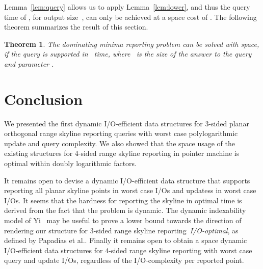 \documentclass[]{article}
\newtheorem{theorem}{Theorem}[section]
\begin{document}
Lemma~\ref{lem:query} allows us to apply Lemma~\ref{lem:lower}, and thus the
query time of , for output size~, can only be
achieved at a space cost of . The following theorem summarizes
the result of this section.
\begin{theorem} \label{thm:lower}
  The dominating minima reporting problem can be solved with
   space, if the query is
  supported in~ time, where~ is the size of the
  answer to the query and parameter .
\end{theorem}

\section{Conclusion} \label{sect:concl}


We presented the first dynamic I/O-efficient data structures for 3-sided planar
orthogonal range skyline reporting queries with worst case polylogarithmic
update and query complexity. We also showed that the space usage of the existing
structures for 4-sided range skyline reporting in pointer machine is optimal
within doubly logarithmic factors.

It remains open to devise a dynamic I/O-efficient data structure that supports
reporting all  planar skyline points in  worst case I/Os and
updatess in  worst case I/Os. It seems that the hardness for
reporting the skyline in optimal time is derived from the fact that the problem
is dynamic. The dynamic indexability model of Yi~\cite{Y09} may be useful to
prove a lower bound towards the direction of rendering our structure for 3-sided
range skyline reporting~\textit{I/O-optimal}, as defined by Papadias et
al.\cite{PTFS05}. Finally it remains open to obtain a  space dynamic I/O-efficient data structures for 4-sided range skyline
reporting with  worst case query and update I/Os, regardless
of the I/O-complexity per reported point.

\clearpage
	
	
\end{document}
